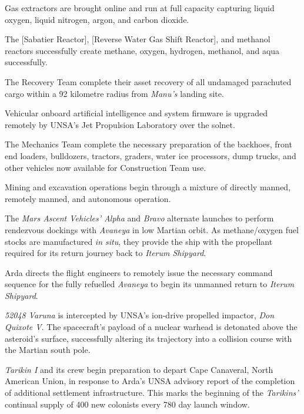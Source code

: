 Gas extractors are brought online and run at full capacity capturing liquid oxygen, liquid nitrogen, argon, and carbon dioxide. 

The [Sabatier Reactor], [Reverse Water Gas Shift Reactor], and methanol reactors successfully create methane, oxygen, hydrogen, methanol, and aqua successfully.
\StopTimelineDate

The Recovery Team complete their asset recovery of all undamaged parachuted cargo within a 92 kilometre radius from {\it Manu's} landing site.
\StopTimelineDate

Vehicular onboard artificial intelligence and system firmware is upgraded remotely by UNSA's Jet Propulsion Laboratory over the solnet.

The Mechanics Team complete the necessary preparation of the backhoes, front end loaders, bulldozers, tractors, graders, water ice processors, dump trucks, and other vehicles now available for Construction Team use.

Mining and excavation operations begin through a mixture of directly manned, remotely manned, and autonomous operation.
\StopTimelineDate

The {\it Mars Ascent Vehicles' Alpha} and {\it Bravo} alternate launches to perform rendezvous dockings with {\it Avaneya} in low Martian orbit. As methane/oxygen fuel stocks are manufactured {\it in situ}, they provide the ship with the propellant required for its return journey back to {\it Iterum Shipyard}.
\StopTimelineDate

Arda directs the flight engineers to remotely issue the necessary command sequence for the fully refuelled {\it Avaneya} to begin its unmanned return to {\it Iterum Shipyard}.
\StopTimelineDate

{\it 52048 Varuna} is intercepted by UNSA's ion-drive propelled impactor, {\it Don Quixote V}. The spacecraft's payload of a nuclear warhead is detonated above the asteroid's surface, successfully altering its trajectory into a collision course with the Martian south pole.
\StopTimelineDate

{\it Tarikin I} and its crew begin preparation to depart Cape Canaveral, North American Union, in response to Arda's UNSA advisory report of the completion of additional settlement infrastructure. This marks the beginning of the {\it Tarikins'} continual supply of 400 new colonists every 780 day launch window.
\StopTimelineDate

